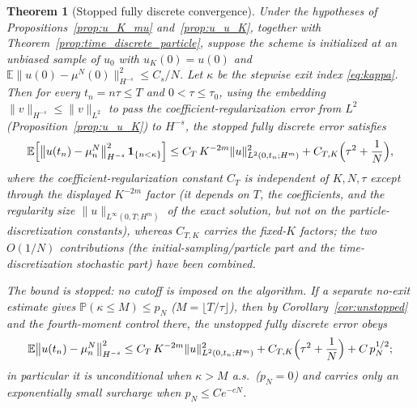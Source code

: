 \documentclass[a4paper,fleqn]{cas-sc}
\newtheorem{theorem}{Theorem}
\theoremstyle{definition}
\theoremstyle{remark}
\begin{document}
\begin{theorem}[Stopped fully discrete convergence]\label{cor:end-to-end}
Under the hypotheses of Propositions~\ref{prop:u_K_mu} and~\ref{prop:u_u_K}, together with
Theorem~\ref{prop:time_discrete_particle}, suppose the scheme is initialized at an
unbiased sample of $u_0$ with $u_K(0)=u(0)$ and
$\mathbb E\|u(0)-\mu^N(0)\|_{H^{-s}}^2\le C_s/N$. Let $\kappa$ be the stepwise exit index
\eqref{eq:kappa}. Then for every $t_n=n\tau\le T$ and $0<\tau\le\tau_0$, using the embedding
$\|v\|_{H^{-s}}\le\|v\|_{L^2}$ to pass the coefficient-regularization error from $L^2$
(Proposition~\ref{prop:u_u_K}) to $H^{-s}$, the \emph{stopped} fully discrete error satisfies
\begin{equation}\label{eq:end-to-end}
\mathbb E\Bigl[\bigl\|u(t_n)-\mu^N_n\bigr\|_{H^{-s}}^2\,\mathbf 1_{\{n<\kappa\}}\Bigr]
\le C_T\,K^{-2m}\|u\|_{L^2(0,t_n;H^m)}^2
+C_{T,K}\Bigl(\tau^2+\frac1N\Bigr),
\end{equation}
where the coefficient-regularization constant $C_T$ is independent of $K,N,\tau$
except through the displayed $K^{-2m}$ factor (it depends on $T$, the coefficients,
and the regularity size $\|u\|_{L^\infty(0,T;H^m)}$ of the exact solution, but
not on the particle-discretization constants), whereas $C_{T,K}$ carries the fixed-$K$
factors; the two $O(1/N)$ contributions (the initial-sampling/particle part and the
time-discretization stochastic part) have been combined.

The bound is \emph{stopped}: no cutoff is imposed on the algorithm. If a separate no-exit estimate
gives $\mathbb P(\kappa\le M)\le p_N$ ($M=\lfloor T/\tau\rfloor$), then by
Corollary~\ref{cor:unstopped} and the fourth-moment control there, the unstopped fully discrete error
obeys
\[
\mathbb E\bigl\|u(t_n)-\mu^N_n\bigr\|_{H^{-s}}^2
\le C_T\,K^{-2m}\|u\|_{L^2(0,t_n;H^m)}^2
+C_{T,K}\Bigl(\tau^2+\frac1N\Bigr)+C\,p_N^{1/2};
\]
in particular it is unconditional when $\kappa>M$ a.s.\ ($p_N=0$) and carries only an exponentially
small surcharge when $p_N\le Ce^{-cN}$.
\end{theorem}
\end{document}
